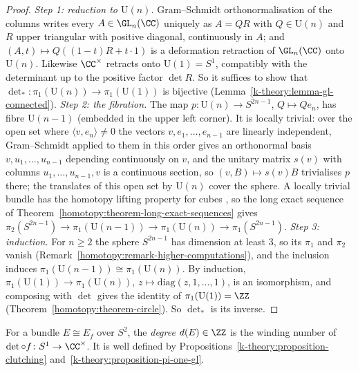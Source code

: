 \begin{proof}
\emph{Step 1: reduction to $\mathrm{U}(n)$.} Gram--Schmidt orthonormalisation of the columns writes every $A \in \GL_n(\CC)$ uniquely as $A = QR$ with $Q \in \mathrm{U}(n)$ and $R$ upper triangular with positive
diagonal, continuously in $A$; and $(A, t) \mapsto Q((1 - t)R + t\cdot 1)$ is a deformation retraction of $\GL_n(\CC)$ onto $\mathrm{U}(n)$. Likewise $\CC^\times$ retracts onto $\mathrm{U}(1) = S^1$, compatibly
with the determinant up to the positive factor $\det R$. So it suffices to show that $\det_* \colon \pi_1(\mathrm{U}(n)) \to \pi_1(\mathrm{U}(1))$ is bijective (Lemma~\ref{k-theory:lemma-gl-connected}).
\emph{Step 2: the fibration.} The map $p \colon \mathrm{U}(n) \to S^{2n-1}$, $Q \mapsto Qe_n$, has fibre $\mathrm{U}(n-1)$ (embedded in the upper left corner). It is locally trivial: over the open set where
$\langle v, e_n\rangle \neq 0$ the vectors $v, e_1, \ldots, e_{n-1}$ are linearly independent, Gram--Schmidt applied to them in this order gives an orthonormal basis $v, u_1, \ldots, u_{n-1}$ depending continuously
on $v$, and the unitary matrix $s(v)$ with columns $u_1, \ldots, u_{n-1}, v$ is a continuous section, so $(v, B) \mapsto s(v)B$ trivialises $p$ there; the translates of this open set by $\mathrm{U}(n)$ cover the sphere. A locally trivial bundle has the homotopy lifting property for cubes \cite[Proposition 4.48]{hatcher-at}, so the long exact sequence of
Theorem~\ref{homotopy:theorem-long-exact-sequences} gives
$\pi_2(S^{2n-1}) \to \pi_1(\mathrm{U}(n-1)) \to \pi_1(\mathrm{U}(n)) \to \pi_1(S^{2n-1})$.
\emph{Step 3: induction.} For $n \geq 2$ the sphere $S^{2n-1}$ has dimension at least $3$, so its $\pi_1$ and $\pi_2$ vanish (Remark~\ref{homotopy:remark-higher-computations}), and the inclusion induces
$\pi_1(\mathrm{U}(n-1)) \cong \pi_1(\mathrm{U}(n))$. By induction, $\pi_1(\mathrm{U}(1)) \to \pi_1(\mathrm{U}(n))$, $z \mapsto \mathrm{diag}(z, 1, \ldots, 1)$, is an isomorphism, and composing with $\det$ gives the
identity of $\pi_1(\mathrm{U}(1)) = \ZZ$ (Theorem~\ref{homotopy:theorem-circle}). So $\det_*$ is its inverse.
\end{proof}

\begin{definition}\label{k-theory:definition-degree}
For a bundle $E \cong E_f$ over $S^2$, the \emph{degree} $d(E) \in \ZZ$ is the winding number of $\det \circ f \colon S^1 \to \CC^\times$. It is well defined by
Propositions~\ref{k-theory:proposition-clutching} and~\ref{k-theory:proposition-pi-one-gl}.
\end{definition}


